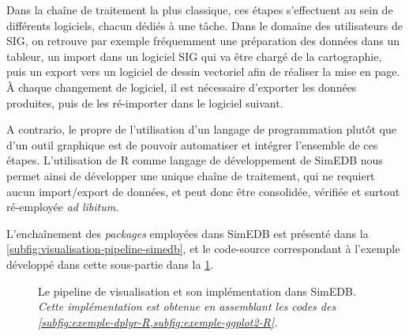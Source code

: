 Dans la chaîne de traitement la plus classique, ces étapes s'effectuent au sein de différents logiciels, chacun dédiés à une tâche. Dans le domaine des utilisateurs de SIG, on retrouve par exemple fréquemment une préparation des données dans un tableur, un import dans un logiciel SIG qui va être chargé de la cartographie, puis un export vers un logiciel de dessin vectoriel afin de réaliser la mise en page.
À chaque changement de logiciel, il est nécessaire d'exporter les données produites, puis de les ré-importer dans le logiciel suivant.

A contrario, le propre de l'utilisation d'un langage de programmation plutôt que d'un outil graphique est de pouvoir automatiser et intégrer l'ensemble de ces étapes.
L'utilisation de \textsf{R} comme langage de développement de SimEDB nous permet ainsi de développer une unique chaîne de traitement, qui ne requiert aucun import/export de données, et peut donc être consolidée, vérifiée et surtout ré-employée \textit{ad libitum}.

L'enchaînement des \textit{packages} employées dans SimEDB est présenté dans la \cref{subfig:visualisation-pipeline-simedb}, et le code-source correspondant à l'exemple développé dans cette sous-partie dans la \cref{fig:visualisation-pipeline-exemple}.

\begin{figure}[H]
	\centering
	\hspace{5pt}
	\caption[Le \og pipeline\fg{} de visualisation et son implémentation dans SimEDB.]{Le \og pipeline\fg{} de visualisation et son implémentation dans SimEDB.\\
	\textit{Cette implémentation est obtenue en assemblant les codes des \cref{subfig:exemple-dplyr-R,subfig:exemple-ggplot2-R}.}}
	\label{fig:visualisation-pipeline-exemple}
\end{figure}

